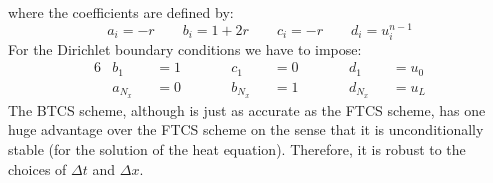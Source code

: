 where the coefficients are defined by:
\begin{equation}
	a_i = -r \quad \quad b_i = 1+2r \quad \quad c_i = -r \quad \quad d_i = u^{n-1}_i	
	\nonumber
\end{equation}
For the Dirichlet boundary conditions we have to impose:
\begin{alignat*}{6}
	& b_1     &&= 1  && \quad \quad c_1     &&= 0  && \quad \quad d_1     &&= u_0  \\
	& a_{N_x} &&= 0  && \quad \quad b_{N_x} &&= 1  && \quad \quad d_{N_x} &&= u_L	
\end{alignat*}
The BTCS scheme, although is just as accurate as the FTCS scheme, has one huge advantage over the FTCS scheme on the sense that it is unconditionally stable (for the solution of the heat equation). Therefore, it is robust to the choices of $\Delta t$ and $\Delta x$.



